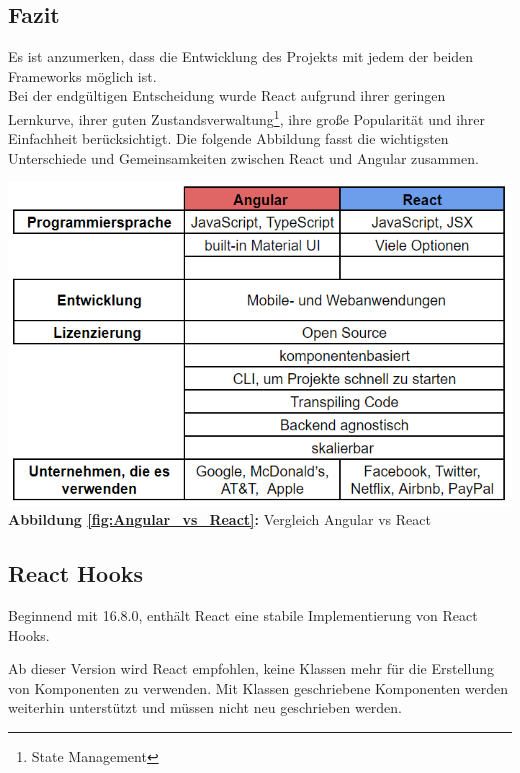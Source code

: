 \subsection{Fazit}
Es ist anzumerken, dass die Entwicklung des Projekts mit jedem der beiden Frameworks möglich ist.
\\
Bei der endgültigen Entscheidung wurde React aufgrund ihrer geringen Lernkurve, ihrer guten Zustandsverwaltung\footnote{State Management}, ihre große Popularität und ihrer Einfachheit berücksichtigt.
Die folgende Abbildung fasst die wichtigsten Unterschiede und Gemeinsamkeiten zwischen React und Angular zusammen.
  \begin{center}
    \includegraphics[scale=0.7]
    {sources/Angular_vs_React}\label{fig:Angular_vs_React}\\
    \textbf{Abbildung \autoref{fig:Angular_vs_React}:}
    Vergleich Angular vs React
  \end{center}


\subsection{React Hooks}
Beginnend mit 16.8.0, enthält React eine stabile Implementierung von React Hooks.

Ab dieser Version wird React empfohlen, keine Klassen mehr für die Erstellung von Komponenten zu verwenden.
Mit Klassen geschriebene Komponenten werden weiterhin unterstützt und müssen nicht neu geschrieben werden.
  {\cite{R05}}
\\

